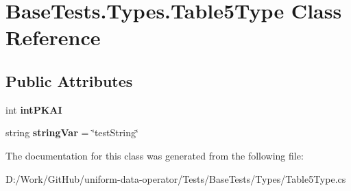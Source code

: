 \hypertarget{class_base_tests_1_1_types_1_1_table5_type}{}\section{Base\+Tests.\+Types.\+Table5\+Type Class Reference}
\label{class_base_tests_1_1_types_1_1_table5_type}
\subsection*{Public Attributes}
\begin{DoxyCompactItemize}
\item 
\mbox{\label{class_base_tests_1_1_types_1_1_table5_type_ae14f965f57c11a3a98b3b0533ef26f13}} 
int {\bfseries int\+P\+K\+AI}
\item 
\mbox{\label{class_base_tests_1_1_types_1_1_table5_type_ae30aa67ba478910dd4e0d7872e898f83}} 
string {\bfseries string\+Var} = \char`\"{}test\+String\char`\"{}
\end{DoxyCompactItemize}


The documentation for this class was generated from the following file\+:\begin{DoxyCompactItemize}
\item 
D\+:/\+Work/\+Git\+Hub/uniform-\/data-\/operator/\+Tests/\+Base\+Tests/\+Types/Table5\+Type.\+cs\end{DoxyCompactItemize}
